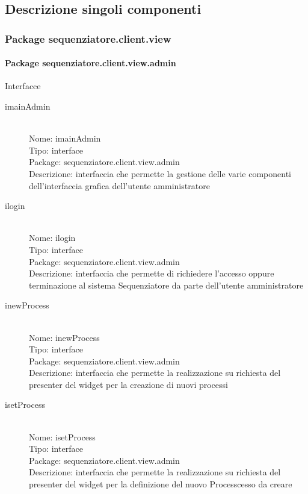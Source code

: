 \subsection{Descrizione singoli componenti}
\subsubsection{Package sequenziatore.client.view}
\paragraph{Package sequenziatore.client.view.admin}
Interfacce \\
\begin{description}
	\item[imainAdmin] 
  	\hfill \\
  	Nome: imainAdmin\\
  	Tipo: interface\\
	Package: sequenziatore.client.view.admin\\
	Descrizione: interfaccia che permette la gestione delle varie componenti 	dell'interfaccia grafica dell'utente amministratore
\end{description}

\begin{description}
	\item[ilogin] 
  	\hfill \\
  	Nome: ilogin\\
  	Tipo: interface\\
	Package: sequenziatore.client.view.admin\\
	Descrizione: interfaccia che permette di richiedere l'accesso oppure terminazione al sistema Sequenziatore da parte dell’utente amministratore
\end{description}

\begin{description}
	\item[inewProcess] 
  	\hfill \\
  	Nome: inewProcess\\
  	Tipo: interface\\
	Package: sequenziatore.client.view.admin\\
	Descrizione: interfaccia che permette la realizzazione su richiesta del presenter del widget per la creazione di nuovi processi
\end{description}

\begin{description}
	\item[isetProcess] 
  	\hfill \\
  	Nome: isetProcess\\
  	Tipo: interface\\
	Package: sequenziatore.client.view.admin\\
	Descrizione: interfaccia che permette la realizzazione su richiesta del presenter del widget per la definizione del nuovo Processcesso da creare
\end{description}

